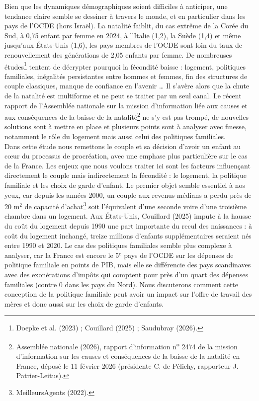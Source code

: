 \documentclass[12pt,a4paper]{article}
\begin{document}
\noindent Bien que les dynamiques démographiques soient difficiles à anticiper, une tendance claire semble se dessiner à travers le monde, et en particulier dans les pays de l’OCDE (hors Israël). La natalité faiblit, du cas extrême de la Corée du Sud, à 0,75 enfant par femme en 2024, à l’Italie (1,2), la Suède (1,4) et même jusqu’aux États-Unis (1,6), les pays membres de l’OCDE sont loin du taux de renouvellement des générations de 2,05 enfants par femme. De nombreuses études\footnote{Doepke et al. (2023) ; Couillard (2025) ; Saudubray (2026).} tentent de décrypter pourquoi la fécondité baisse : logement, politiques familiales, inégalités persistantes entre hommes et femmes, fin des structures de couple classiques, manque de confiance en l’avenir … Il s’avère alors que la chute de la natalité est multiforme et ne peut se traiter par un seul canal. Le récent rapport de l’Assemblée nationale sur la mission d’information liée aux causes et aux conséquences de la baisse de la natalité\footnote{Assemblée nationale (2026), rapport d’information n\textsuperscript{o} 2474 de la mission d’information sur les causes et conséquences de la baisse de la natalité en France, déposé le 11 février 2026 (présidente C. de Pélichy, rapporteur J. Patrier-Leitus).} ne s’y est pas trompé, de nouvelles solutions sont à mettre en place et plusieurs points sont à analyser avec finesse, notamment le rôle du logement mais aussi celui des politiques familiales. \\

\noindent Dans cette étude nous remettons le couple et sa décision d’avoir un enfant au cœur du processus de procréation, avec une emphase plus particulière sur le cas de la France. Les enjeux que nous voulons traiter ici sont les facteurs influençant directement le couple mais indirectement la fécondité : le logement, la politique familiale et les choix de garde d’enfant. Le premier objet semble essentiel à nos yeux, car depuis les années 2000, un couple aux revenus médians a perdu près de 20 m$^2$ de capacité d’achat\footnote{MeilleursAgents (2022).}  soit l’équivalent d’une seconde voire d’une troisième chambre dans un logement. Aux États-Unis, Couillard (2025) impute à la hausse du coût du logement depuis 1990 une part importante du recul des naissances : à coût du logement inchangé, treize millions d’enfants supplémentaires seraient nés entre 1990 et 2020. Le cas des politiques familiales semble plus complexe à analyser, car la France est encore le 5$^e$ pays de l’OCDE sur les dépenses de politique familiale en points de PIB, mais elle se différencie des pays scandinaves avec des exonérations d’impôts qui comptent pour près d’un quart des dépenses familiales (contre 0 dans les pays du Nord). Nous discuterons comment cette conception de la politique familiale peut avoir un impact sur l’offre de travail des mères et donc aussi sur les choix de garde d’enfants. \\
\end{document}
